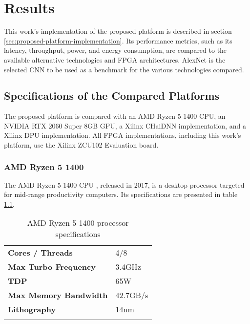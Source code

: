 \chapter{Results}
This work's implementation of the proposed platform is described in section \ref{sec:proposed-platform-implementation}. Its performance metrics, such as its latency, throughput, power, and energy consumption, are compared to the available alternative technologies and FPGA architectures. AlexNet is the selected CNN to be used as a benchmark for the various technologies compared.

\section{Specifications of the Compared Platforms}
The proposed platform is compared with an AMD Ryzen 5 1400 CPU, an NVIDIA RTX 2060 Super 8GB GPU, a Xilinx CHaiDNN implementation, and a Xilinx DPU implementation. All FPGA implementations, including this work's platform, use the Xilinx ZCU102 Evaluation board.

\subsection{AMD Ryzen 5 1400}
The AMD Ryzen 5 1400 CPU \cite{AMD-Ryzen-5-1400-Processor}, released in 2017, is a desktop processor targeted for mid-range productivity computers. Its specifications are presented in table \ref{tab:AMD-Ryzen-5-1400-specs}.

\begin{table}[H]
	\caption{AMD Ryzen 5 1400 processor specifications}
	\label{tab:AMD-Ryzen-5-1400-specs}
	\centering
	\begin{tabular}{ll}
		\toprule
		\textbf{Cores / Threads} & 4/8\\
		\textbf{Max Turbo Frequency} & 3.4GHz\\
		\textbf{TDP} & 65W\\
		\textbf{Max Memory Bandwidth} & 42.7GB/s\\
		\textbf{Lithography} & 14nm\\
		\bottomrule\\
	\end{tabular}
\end{table}


